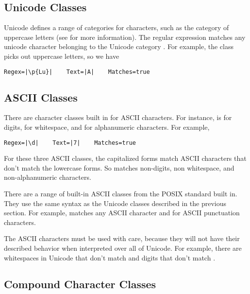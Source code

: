 \subsection{Unicode Classes}

Unicode defines a range of categories for characters, such as the
category  of uppercase letters (see
 for more information).  The regular
expression  matches any unicode character
belonging to the Unicode category .  For example,
the class  picks out uppercase letters, so we have
%
\begin{verbatim}
Regex=|\p{Lu}|    Text=|A|    Matches=true
\end{verbatim}
%


\subsection{ASCII Classes}

There are character classes built in for ASCII characters.  For
instance,  is for digits,  for whitespace,
and  for alphanumeric characters.  For example,
%
\begin{verbatim}
Regex=|\d|    Text=|7|    Matches=true
\end{verbatim}
%
For these three ASCII classes, the capitalized forms match
ASCII characters that don't match the lowercase forms.  So
 matches non-digits,  non whitespace,
and  non-alphanumeric characters.

There are a range of built-in ASCII classes from the POSIX standard
built in.  They use the same syntax as the Unicode classes described
in the previous section.  For example,  matches
any ASCII character and  for ASCII punctuation
characters.

The ASCII characters must be used with care, because they will not
have their described behavior when interpreted over all of Unicode.
For example, there are whitespaces in Unicode that don't match
 and digits that don't match .

\subsection{Compound Character Classes}

